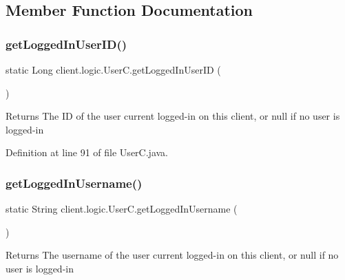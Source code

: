 \subsection{Member Function Documentation}
\hypertarget{classclient_1_1logic_1_1_user_c_a984cd3489f4deea4f5b96c450635538a}{}\label{classclient_1_1logic_1_1_user_c_a984cd3489f4deea4f5b96c450635538a} 
\subsubsection{\texorpdfstring{get\+Logged\+In\+User\+I\+D()}{getLoggedInUserID()}}
{\footnotesize\ttfamily static Long client.\+logic.\+User\+C.\+get\+Logged\+In\+User\+ID (\begin{DoxyParamCaption}{ }\end{DoxyParamCaption})\hspace{0.3cm}{\ttfamily [static]}}

\begin{DoxyReturn}{Returns}
The ID of the user current logged-\/in on this client, or null if no user is logged-\/in 
\end{DoxyReturn}


Definition at line 91 of file User\+C.\+java.

\hypertarget{classclient_1_1logic_1_1_user_c_a93ff0dc94af63f55144147389b0b2bdf}{}\label{classclient_1_1logic_1_1_user_c_a93ff0dc94af63f55144147389b0b2bdf} 
\subsubsection{\texorpdfstring{get\+Logged\+In\+Username()}{getLoggedInUsername()}}
{\footnotesize\ttfamily static String client.\+logic.\+User\+C.\+get\+Logged\+In\+Username (\begin{DoxyParamCaption}{ }\end{DoxyParamCaption})\hspace{0.3cm}{\ttfamily [static]}}

\begin{DoxyReturn}{Returns}
The username of the user current logged-\/in on this client, or null if no user is logged-\/in 
\end{DoxyReturn}


